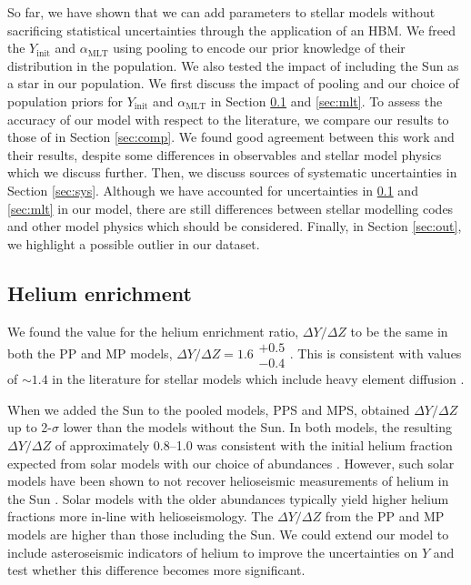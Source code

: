 \documentclass[fleqn,usenatbib]{mnras}
\newcommand{\mlt}{\ensuremath{{\alpha_\mathrm{MLT}}}}
\begin{document}
So far, we have shown that we can add parameters to stellar models without sacrificing statistical uncertainties through the application of an HBM. We freed the $Y_\mathrm{init}$ and $\mlt$ using pooling to encode our prior knowledge of their distribution in the population. We also tested the impact of including the Sun as a star in our population. We first discuss the impact of pooling and our choice of population priors for $Y_\mathrm{init}$ and $\mlt$ in Section \ref{sec:helium} and \ref{sec:mlt}. To assess the accuracy of our model with respect to the literature, we compare our results to those of  in Section \ref{sec:comp}. We found good agreement between this work and their results, despite some differences in observables and stellar model physics which we discuss further. Then, we discuss sources of systematic uncertainties in Section \ref{sec:sys}. Although we have accounted for uncertainties in \ref{sec:helium} and \ref{sec:mlt} in our model, there are still differences between stellar modelling codes and other model physics which should be considered. Finally, in Section \ref{sec:out}, we highlight a possible outlier in our dataset.

\subsection{Helium enrichment}\label{sec:helium}

We found the value for the helium enrichment ratio, $\Delta Y / \Delta Z$ to be the same in both the PP and MP models, $\Delta Y / \Delta Z = 1.6\substack{+0.5\\-0.4}$. This is consistent with values of $\sim 1.4$ in the literature for stellar models which include heavy element diffusion \citep{Brogaard.VandenBerg.ea2012, Verma.Raodeo.ea2019}.

When we added the Sun to the pooled models, PPS and MPS, obtained $\Delta Y / \Delta Z$ up to 2-$\sigma$ lower than the models without the Sun. In both models, the resulting $\Delta Y / \Delta Z$ of approximately \numrange{0.8}{1.0} was consistent with the initial helium fraction expected from solar models with our choice of \citet{Asplund.Grevesse.ea2009} abundances \citep{Serenelli.Basu2010}. However, such solar models have been shown to not recover helioseismic measurements of helium in the Sun \citep{Basu.Antia2004, Serenelli.Basu.ea2009, Villante.Serenelli.ea2014}. Solar models with the older \citet{Grevesse.Sauval1998} abundances typically yield higher helium fractions more in-line with helioseismology. The $\Delta Y / \Delta Z$ from the PP and MP models are higher than those including the Sun. We could extend our model to include asteroseismic indicators of helium to improve the uncertainties on $Y$ and test whether this difference becomes more significant.
\end{document}
